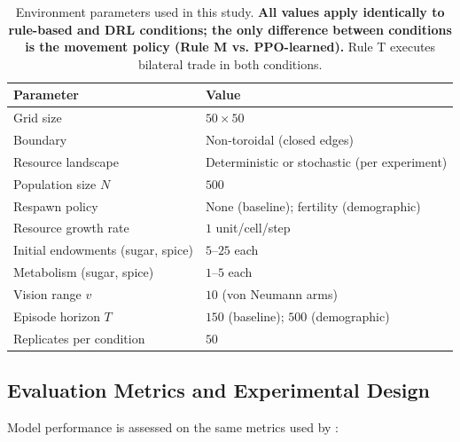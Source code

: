 \documentclass[pdflatex,sn-mathphys-num]{sn-jnl}%
\theoremstyle{thmstyleone}%
\theoremstyle{thmstyletwo}%
\theoremstyle{thmstylethree}%
\begin{document}
\begin{table}[h!]
\centering
\caption{Environment parameters used in this study. \textbf{All values apply identically to rule-based and DRL conditions; the only difference between conditions is the movement policy (Rule M vs. PPO-learned).} Rule T executes bilateral trade in both conditions.}
\label{tab:study_params}
\begin{tabular}{ll}
\hline
\textbf{Parameter} & \textbf{Value} \\
\hline
Grid size & $50 \times 50$ \\
Boundary & Non-toroidal (closed edges) \\
Resource landscape & Deterministic or stochastic (per experiment) \\
Population size $N$ & $500$ \\
Respawn policy & None (baseline); fertility (demographic) \\
Resource growth rate & $1$ unit/cell/step \\
Initial endowments (sugar, spice) & $5$--$25$ each \\
Metabolism (sugar, spice) & $1$--$5$ each \\
Vision range $v$ & $10$ (von Neumann arms) \\
Episode horizon $T$ & $150$ (baseline); $500$ (demographic) \\
Replicates per condition & $50$ \\
\hline
\end{tabular}
\end{table}

\subsection{Evaluation Metrics and Experimental Design}
Model performance is assessed on the same metrics used by \citet{EpsteinAxtell1996}:
\end{document}
